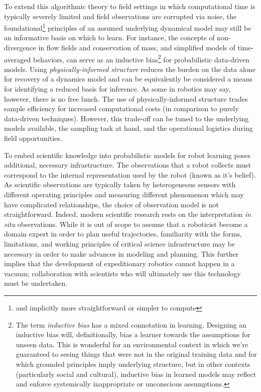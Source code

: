 To extend this algorithmic theory to field settings in which computational time is typically severely limited and field observations are corrupted via noise, the foundational\footnote{and implicitly more straightforward or simpler to compute} principles of an assumed underlying dynamical model may still be an informative basis on which to learn.
For instance, the concepts of non-divergence in flow fields and conservation of mass, and simplified models of time-averaged behaviors, can serve as an inductive bias\footnote{The term \emph{inductive bias} has a mixed connotation in learning. Designing an inductive bias will, definitionally, bias a learner towards the assumptions for unseen data. This is wonderful for an environmental context in which we're guaranteed to seeing things that were not in the original training data and for which grounded principles imply underlying structure, but in other contexts (particularly social and cultural), inductive bias in learned models may reflect and enforce systemically inappropriate or unconscious assumptions.} for probabilistic data-driven models.
Using \emph{physically-informed structure} reduces the burden on the data alone for recovery of a dynamics model and can be equivalently be considered a means for identifying a reduced basis for inference.
As some in robotics may say, however, there is no free lunch.
The use of physically-informed structure trades sample efficiency for increased computational costs (in comparison to purely data-driven techniques).
However, this trade-off can be tuned to the underlying models available, the sampling task at hand, and the operational logistics during field opportunities.

To embed scientific knowledge into probabilistic models for robot learning poses additional, necessary infrastructure.
The observations that a robot collects must correspond to the internal representation used by the robot (known as it's belief).
As scientific observations are typically taken by heterogeneous sensors with different operating principles and measuring different phenomenon which may have complicated relationships, the choice of observation model is not straightforward.
Indeed, modern scientific research rests on the interpretation \emph{in situ} observations.
While it is out of scope to assume that a roboticist become a domain expert in order to plan useful trajectories, familiarity with the forms, limitations, and working principles of critical science infrastructure may be necessary in order to make advances in modeling and planning.
This further implies that the development of expeditionary robotics cannot happen in a vacuum; collaboration with scientists who will ultimately use this technology must be undertaken.

